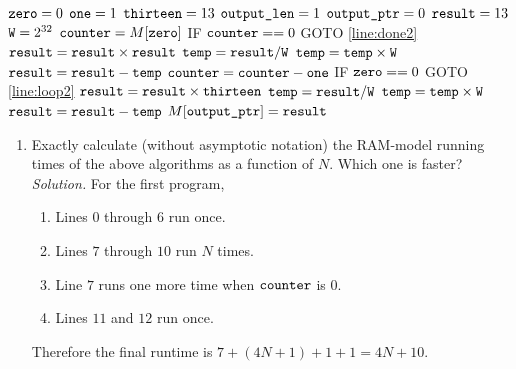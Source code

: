 \documentclass[11pt]{article}
\begin{document}
\begin{enumerate}
\begin{algorithm}[H]
\setcounter{AlgoLine}{-1}
$\texttt{zero} = 0$\;
$\texttt{one} = 1$\;
$\texttt{thirteen} = 13$\;
$\texttt{output\_len} = 1$\;
$\texttt{output\_ptr} = 0$\;
$\texttt{result} = 13$\;
$\texttt{W} = 2^{32}$\;
$\texttt{counter} = M[\texttt{zero}]$\;
\Indp
IF $\texttt{counter} == 0$ GOTO \ref{line:done2}\; \label{line:loop2}
$\texttt{result} = \texttt{result} \times \texttt{result}$\;
$\texttt{temp} = \texttt{result} / \texttt{W}$\;
$\texttt{temp} = \texttt{temp} \times \texttt{W}$\;
$\texttt{result} = \texttt{result} - \texttt{temp}$\;
$\texttt{counter} = \texttt{counter} - \texttt{one}$\;
IF $\texttt{zero} == 0$ GOTO \ref{line:loop2}\;
\Indm
$\texttt{result} = \texttt{result} \times \texttt{thirteen}$\;
\label{line:done2}
$\texttt{temp} = \texttt{result} / \texttt{W}$\;
$\texttt{temp} = \texttt{temp} \times \texttt{W}$\;
$\texttt{result} = \texttt{result} - \texttt{temp}$\;
$M[\texttt{output\_ptr}]=\texttt{result}$\; 
\end{algorithm}

\begin{enumerate}
    \item Exactly calculate (without asymptotic notation) the RAM-model running times of the above algorithms as a function of $N$.
    Which one is faster? \label{itm:RAMtime} \\
    \textit{Solution.} For the first program,
    \begin{enumerate}
        \item Lines $0$ through $6$ run once.
        \item Lines $7$ through $10$ run $N$ times.
        \item Line $7$ runs one more time when $\texttt{counter}$ is $0$.
        \item Lines $11$ and $12$ run once.
    \end{enumerate}
    Therefore the final runtime is $7+(4N+1)+1+1 = \boxed{4N+10}$.


\end{enumerate}
\end{enumerate}
\end{document}
